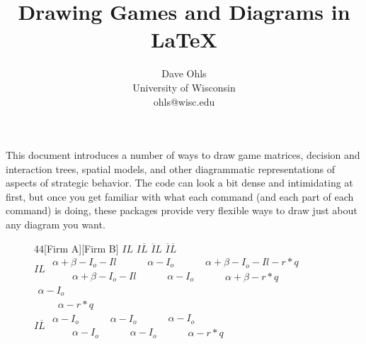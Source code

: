 \documentclass[10.5pt]{article}
\title{Drawing Games and Diagrams in \LaTeX}
\author{Dave Ohls \\ University of Wisconsin \\ ohls@wisc.edu}
\date{}
\begin{document}
\maketitle

This document introduces a number of ways to draw game matrices, decision and interaction trees, spatial models, and other diagrammatic representations of aspects of strategic behavior.  The code can look a bit dense and intimidating at first, but once you get familiar with what each command (and each part of each command) is doing, these packages provide very flexible ways to draw just about any diagram you want.   \\






\begin{figure}[ h!]
\begin{center} 
\begin{footnotesize}
\begin{game}{4}{4}[Firm A][Firm B]
       						 \> $IL$  	\> $I\overline{L}$ 	\> $\overline{I}L$  \> $\overline{I}\overline{L}$   \\
$IL$     					 \> $\begin{array}{l}\alpha+\beta-I_{o}-I{l} \\[0.0mm]\phantom{--}\alpha+\beta-I_{o}-I{l} \end{array}$
							 \> $\begin{array}{l}\alpha-I_{o} \\[0.0mm]\phantom{--}\alpha-I_{o} \end{array}$
							 \> $\begin{array}{l}\alpha+\beta-I_{o}-I{l}-r*q \\[0.0mm]\phantom{--}\alpha+\beta-r*q \end{array}$
							 \> $\begin{array}{l}\alpha-I_{o} \\[0.0mm]\phantom{--}\alpha-r*q \end{array}$
							 \\$I\overline{L}$
							  \> $\begin{array}{l}\alpha-I_{o} \\[0.0mm]\phantom{--}\alpha-I_{o} \end{array}$
							  \> $\begin{array}{l}\alpha-I_{o} \\[0.0mm]\phantom{--}\alpha-I_{o} \end{array}$
							  \> $\begin{array}{l}\alpha-I_{o} \\[0.0mm]\phantom{--}\alpha-r*q \end{array}$

\end{game}
\end{footnotesize}
\end{center}
\end{figure}
\end{document}

